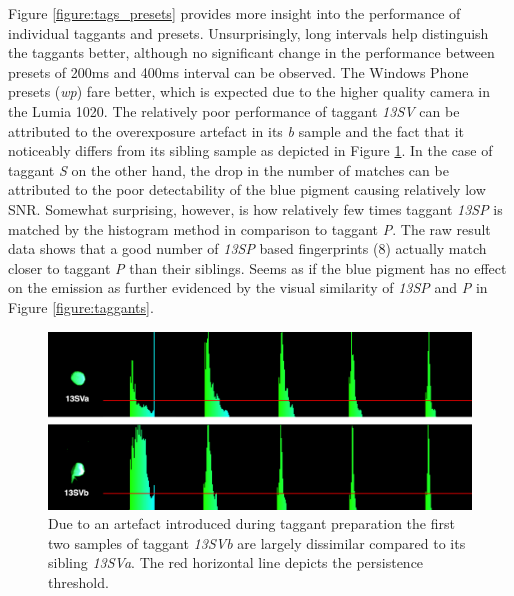 \documentclass[thesis.tex]{subfiles}
\begin{document}
Figure \ref{figure:tags_presets} provides more insight into the performance of individual taggants and presets. Unsurprisingly, long intervals help distinguish the taggants better, although no significant change in the performance between presets of 200ms and 400ms interval can be observed. The Windows Phone presets (\emph{wp}) fare better, which is expected due to the higher quality camera in the Lumia 1020. The relatively poor performance of taggant \emph{13SV} can be attributed to the overexposure artefact in its \emph{b} sample and the fact that it noticeably differs from its sibling sample as depicted in Figure \ref{figure:13SV}. In the case of taggant \emph{S} on the other hand, the drop in the number of matches can be attributed to the poor detectability of the blue pigment causing relatively low SNR. Somewhat surprising, however, is how relatively few times taggant \emph{13SP} is matched by the histogram method in comparison to taggant \emph{P}. The raw result data shows that a good number of \emph{13SP} based fingerprints (8) actually match closer to taggant \emph{P} than their siblings. Seems as if the blue pigment has no effect on the emission as further evidenced by the visual similarity of \emph{13SP} and \emph{P} in Figure \ref{figure:taggants}.

\begin{figure}[h!]
  \centering \includegraphics[page=1,width=\textwidth]{images/findings/13SV}
  \caption{Due to an artefact introduced during taggant preparation the first two samples of taggant \emph{13SVb} are largely dissimilar compared to its sibling \emph{13SVa}. The red horizontal line depicts the persistence threshold.}
  \label{figure:13SV}
\end{figure}
\end{document}
